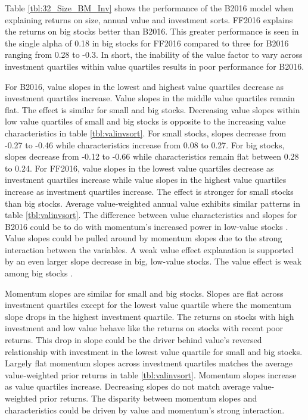 Table \ref{tbl:32_Size_BM_Inv} shows the performance of the B2016 model when explaining
returns on size, annual value and investment sorts. FF2016 explains the returns on big
stocks better than B2016. This greater performance is seen in the single alpha of 0.18 in
big stocks for FF2016 compared to three for B2016 ranging from 0.28 to -0.3. In short, the
inability of the value factor to vary across investment quartiles within value quartiles
results in poor performance for B2016.

For B2016, value slopes in the lowest and highest value quartiles decrease as investment
quartiles increase. Value slopes in the middle value quartiles remain flat. The effect is
similar for small and big stocks. Decreasing value slopes within low value quartiles of
small and big stocks is opposite to the increasing value characteristics in table
\ref{tbl:valinvsort}. For small stocks, slopes decrease from -0.27 to -0.46 while
characteristics increase from 0.08 to 0.27. For big stocks, slopes decrease from -0.12 to
-0.66 while characteristics remain flat between 0.28 to 0.24. For FF2016, value slopes in
the lowest value quartiles decrease as investment quartiles increase while value slopes in
the highest value quartiles increase as investment quartiles increase. The effect is
stronger for small stocks than big stocks. Average value-weighted annual value exhibits
similar patterns in table \ref{tbl:valinvsort}. The difference between value
characteristics and slopes for B2016 could be to do with momentum's increased power in
low-value stocks \parencite{asness1997interaction}. Value slopes could be pulled around by
momentum slopes due to the strong interaction between the variables. A weak value effect
explanation is supported by an even larger slope decrease in big, low-value stocks. The
value effect is weak among big stocks \parencite{asness2015fact}.

Momentum slopes are similar for small and big stocks. Slopes are flat across investment
quartiles except for the lowest value quartile where the momentum slope drops in the
highest investment quartile. The returns on stocks with high investment and low value
behave like the returns on stocks with recent poor returns. This drop in slope could be
the driver behind value's reversed relationship with investment in the lowest value
quartile for small and big stocks. Largely flat momentum slopes across investment
quartiles matches the average value-weighted prior returns in table \ref{tbl:valinvsort}.
Momentum slopes increase as value quartiles increase. Decreasing slopes do not match
average value-weighted prior returns. The disparity between momentum slopes and
characteristics could be driven by value and momentum's strong interaction.

